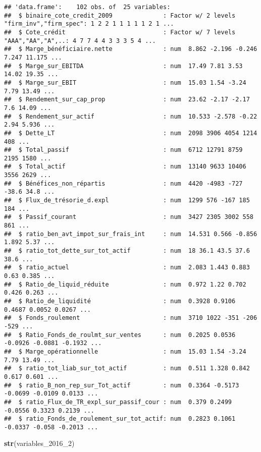 \documentclass[
]{article}
\newenvironment{Shaded}{\begin{snugshade}}{\end{snugshade}}
\newcommand{\DecValTok}[1]{\textcolor[rgb]{0.00,0.00,0.81}{#1}}
\newcommand{\KeywordTok}[1]{\textcolor[rgb]{0.13,0.29,0.53}{\textbf{#1}}}
\newcommand{\NormalTok}[1]{#1}
\begin{document}
\begin{verbatim}
## 'data.frame':    102 obs. of  25 variables:
##  $ binaire_cote_credit_2009              : Factor w/ 2 levels "firm_inv","firm_spec": 1 2 2 1 1 1 1 1 2 1 ...
##  $ Cote_crédit                           : Factor w/ 7 levels "AAA","AA","A",..: 4 7 7 4 4 3 3 3 5 4 ...
##  $ Marge_bénéficiaire.nette              : num  8.862 -2.196 -0.246 7.247 11.175 ...
##  $ Marge_sur_EBITDA                      : num  17.49 7.81 3.53 14.02 19.35 ...
##  $ Marge_sur_EBIT                        : num  15.03 1.54 -3.24 7.79 13.49 ...
##  $ Rendement_sur_cap_prop                : num  23.62 -2.17 -2.17 7.6 14.09 ...
##  $ Rendement_sur_actif                   : num  10.533 -2.578 -0.22 2.94 5.936 ...
##  $ Dette_LT                              : num  2098 3906 4054 1214 408 ...
##  $ Total_passif                          : num  6712 12791 8759 2195 1580 ...
##  $ Total_actif                           : num  13140 9633 10406 3556 2629 ...
##  $ Bénéfices_non_répartis                : num  4420 -4983 -727 -38.6 34.8 ...
##  $ Flux_de_trésorie_d.expl               : num  1299 576 -167 185 184 ...
##  $ Passif_courant                        : num  3427 2305 3002 558 861 ...
##  $ ratio_ben_avt_impot_sur_frais_int     : num  14.531 0.566 -0.856 1.892 5.37 ...
##  $ ratio_tot_dette_sur_tot_actif         : num  18 36.1 43.5 37.6 38.6 ...
##  $ ratio_actuel                          : num  2.083 1.443 0.883 0.63 0.385 ...
##  $ Ratio_de_liquid_réduite               : num  0.972 1.22 0.702 0.426 0.263 ...
##  $ Ratio_de_liquidité                    : num  0.3928 0.9106 0.4687 0.0052 0.0267 ...
##  $ Fonds_roulement                       : num  3710 1022 -351 -206 -529 ...
##  $ Ratio_Fonds_de_roulmt_sur_ventes      : num  0.2025 0.0536 -0.0926 -0.0881 -0.1932 ...
##  $ Marge_opérationnelle                  : num  15.03 1.54 -3.24 7.79 13.49 ...
##  $ ratio_tot_liab_sur_tot_actif          : num  0.511 1.328 0.842 0.617 0.601 ...
##  $ ratio_B_non_rep_sur_Tot_actif         : num  0.3364 -0.5173 -0.0699 -0.0109 0.0133 ...
##  $ ratio_Flux_de_TR_expl_sur_passif_cour : num  0.379 0.2499 -0.0556 0.3323 0.2139 ...
##  $ ratio_Fonds_de_roulement_sur_tot_actif: num  0.2823 0.1061 -0.0337 -0.058 -0.2013 ...
\end{verbatim}

\begin{Shaded}
\begin{Highlighting}[]
\KeywordTok{str}\NormalTok{(variables_}\DecValTok{2016}\NormalTok{_}\DecValTok{2}\NormalTok{)}
\end{Highlighting}
\end{Shaded}
\end{document}
